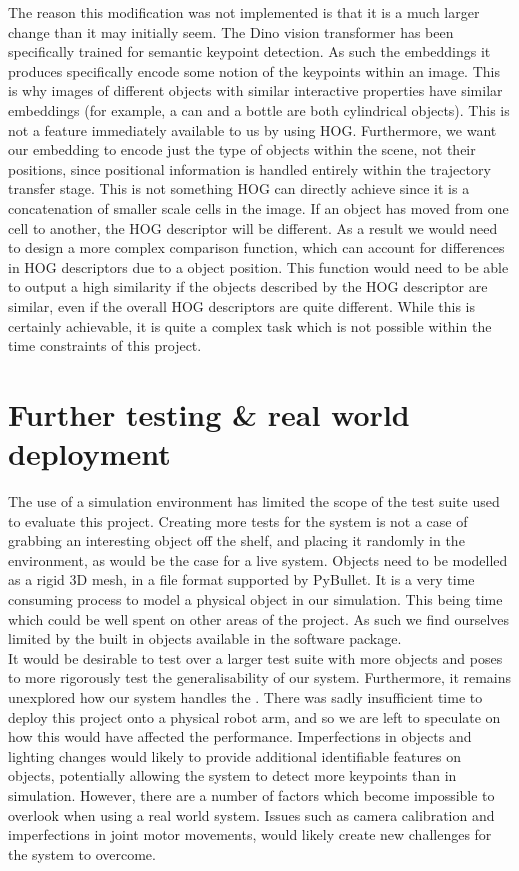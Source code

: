 The reason this modification was not implemented is that it is a much larger change than it may initially seem. The Dino vision transformer has been specifically trained for semantic keypoint detection. As such the embeddings it produces specifically encode some notion of the keypoints within an image. This is why images of different objects with similar interactive properties have similar embeddings (for example, a can and a bottle are both cylindrical objects). This is not a feature immediately available to us by using HOG. Furthermore, we want our embedding to encode just the type of objects within the scene, not their positions, since positional information is handled entirely within the trajectory transfer stage. This is not something HOG can directly achieve since it is a concatenation of smaller scale cells in the image. If an object has moved from one cell to another, the HOG descriptor will be different. As a result we would need to design a more complex comparison function, which can account for differences in HOG descriptors due to a object position. This function would need to be able to output a high similarity if the objects described by the HOG descriptor are similar, even if the overall HOG descriptors are quite different. While this is certainly achievable, it is quite a complex task which is not possible within the time constraints of this project.

\section{Further testing \& real world deployment}
The use of a simulation environment has limited the scope of the test suite used to evaluate this project. Creating more tests for the system is not a case of grabbing an interesting object off the shelf, and placing it randomly in the environment, as would be the case for a live system. Objects need to be modelled as a rigid 3D mesh, in a file format supported by PyBullet. It is a very time consuming process to model a physical object in our simulation. This being time which could be well spent on other areas of the project. As such we find ourselves limited by the built in objects available in the software package.\\

It would be desirable to test over a larger test suite with more objects and poses to more rigorously test the generalisability of our system. Furthermore, it remains unexplored how our system handles the . There was sadly insufficient time to deploy this project onto a physical robot arm, and so we are left to speculate on how this would have affected the performance. Imperfections in objects and lighting changes would likely to provide additional identifiable features on objects, potentially allowing the system to detect more keypoints than in simulation. However, there are a number of factors which become impossible to overlook when using a real world system. Issues such as camera calibration and imperfections in joint motor movements, would likely create new challenges for the system to overcome.

